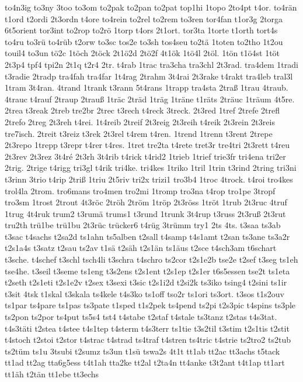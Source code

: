 {to4n3ig
to3ny
3too
to3om
to2pak
to2pan
to2pat
top1hi
1topo
2to4pt
t4or.
to4rän
t1ord
t2ordi
2t3ordn
t4ore
to4rein
to2rel
to2rem
to3ren
tor4fan
t1or3g
2torga
6t5orient
tor3int
to2rop
to2rö
1torp
t4ors
2t1ort.
tor3ta
1torte
t1orth
tort4s
to4ru
to3rü
to4rüb
t2orw
to3sc
tos2e
to3sh
tos4seu
to2tä
1toten
to2tho
1t2ou
touil4
to3un
tö2c
1töch
2töck
2t1ö2d
2tö2f
4t1ök
1tö4l
2töl.
1tön
t1ö4st
1töt
2t3p4
tpf4
tpi2n
2t1q
t2r4
2tr.
t4rab
1trac
tra3cha
tra3chl
2t3rad.
tra4dem
1tradi
t3radie
2tradp
tra4fah
tra4far
1t4rag
2trahm
3t4rai
2t3rake
t4rakt
tra4leb
tral3l
1tram
3t4ran.
4trand
1trank
t3rann
5t4rans
1trapp
tra4sta
2traß
1trau
4traub.
4trauc
t4rauf
2traup
2trauß
1träc
2träd
1träg
1träne
t1räts
2träuc
1träum
4t5re.
2trea
t3reak
2treb
tre2br
2trec
t3rech
t4reck
3treck.
2t3red
1tref
2trefe
2trefl
2trefo
2treg
2t3reh
t4rei.
1t4reib
2treif
2t3reig
2t3reih
t4reik
2t3rein
2t3reis
tre7isch.
2treit
t3reiz
t3rek
2t3rel
t4rem
t4ren.
1trend
1trenn
t3rent
2trepe
2t3repo
1trepp
t3repr
t4rer
t4res.
1tret
tre2ta
t4rete
tret3r
tre4tri
2t3rett
t4reu
2t3rev
2t3rez
3t4ré
2t3rh
3t4rib
t4rick
t4rid2
1trieb
1trief
trie3fr
tri4ena
tri2er
2trig.
2trige
t4rigg
tri3gl
t4rik
tri4ke.
tri4kes
1triko
1tril
1trin
t3rind
2tring
tri3ni
t3rinn
3trio
t4rip
2triß
1triu
2t5riv
tri2x
trizi1
tro3b4
1troc
4trock.
t4roi
tro4kes
trol4la
2trom.
tro6mans
tro4men
tro2mi
1tromp
tro3na
t4rop
tro1pe
3tropf
tro3sm
1trost
2trout
4t3röc
2tröh
2tröm
1tröp
2t3röss
1tröt
1trub
2t3ruc
4truf
1trug
4t4ruk
trum2
t3rumä
trums1
t3rund
1trunk
3t4rup
t3russ
2t3ruß
2t3rut
tru2th
trü1be
trü1bu
2t3rüc
trücker6
t4rüg
3trümm
try1
2ts
4ts.
t3saa
ts3ab
t3sac
t4sachs
t2sa2d
ts1ahn
ts5alben
t2sall
t4samp
t4s1amt
t2san
ts3ane
ts3a2r
t2s1a4s
t3satz
t2sau
ts2av
t1sä
t2säh
t2s1än
ts1äus
t2sce
t4sch3am
t6schart
t3sche.
t4schef
t3schl
tsch4li
t3schra
t4schro
ts2cor
t2s1e2b
tse2e
t2sef
t3seg
ts1eh
tse4he.
t3seil
t3seme
ts1eng
t3s2ens
t2s1ent
t2s1ep
t2s1er
t6s5essen
tse2t
ts1eta
t2seth
t2s1eti
t2s1e2v
t2sex
t3sexi
t3sic
t2s1i2d
t2si2k
ts3iko
tsing4
t2sini
ts1ir
t3sit
4tsk
t1skal
t3skala
ts4kele
t4s3ko
ts1off
tso2r
ts1ori
ts3ort.
t3sos
t1s2ouv
ts1par
ts4pare
ts1pas
ts3pate
t1sped
t1s2pek
ts4pend
ts2pi
t2s3pic
t4spins
ts3ple
ts2pon
ts2por
ts4put
ts5s4
tst4
t4stabe
t2staf
t4stale
ts3tanz
t2stas
t4s3tat.
t4s3täti
t2stea
t4stee
t4s1tep
t4sterm
t4s3terr
ts1tie
t3s2til
t3stim
t2s1tis
t2stit
t4stoch
t2stoi
t2stor
t4strac
t4strad
ts4traf
t4stren
ts4tric
t4strie
ts2tro2
ts2tub
ts2tüm
ts1u
3tsubi
t2sumz
ts3un
t1sü
tswa2s
4t1t
tt1ab
tt2ac
tt3achs
t5tack
tt1ad
tt2ag
tta6g5ess
t4t1ah
tta2ke
tt2al
t2ta4n
tt4anke
t3t2ant
t4t1ap
tt1art
tt1äh
t2tän
tt1ebe
tt3echs
}
